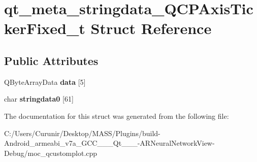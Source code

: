 \hypertarget{structqt__meta__stringdata___q_c_p_axis_ticker_fixed__t}{}\section{qt\+\_\+meta\+\_\+stringdata\+\_\+\+Q\+C\+P\+Axis\+Ticker\+Fixed\+\_\+t Struct Reference}
\label{structqt__meta__stringdata___q_c_p_axis_ticker_fixed__t}
\subsection*{Public Attributes}
\begin{DoxyCompactItemize}
\item 
\mbox{\label{structqt__meta__stringdata___q_c_p_axis_ticker_fixed__t_a029f9dda7bcedf4330e95933b546e1c1}} 
Q\+Byte\+Array\+Data {\bfseries data} \mbox{[}5\mbox{]}
\item 
\mbox{\label{structqt__meta__stringdata___q_c_p_axis_ticker_fixed__t_abe63fa6368ac11a881d489a152852f89}} 
char {\bfseries stringdata0} \mbox{[}61\mbox{]}
\end{DoxyCompactItemize}


The documentation for this struct was generated from the following file\+:\begin{DoxyCompactItemize}
\item 
C\+:/\+Users/\+Curunir/\+Desktop/\+M\+A\+S\+S/\+Plugins/build-\/\+Android\+\_\+armeabi\+\_\+v7a\+\_\+\+G\+C\+C\+\_\+\_\+\_\+\+Qt\+\_\+\_\+\_-\/\+A\+R\+Neural\+Network\+View-\/\+Debug/moc\+\_\+qcustomplot.\+cpp\end{DoxyCompactItemize}
